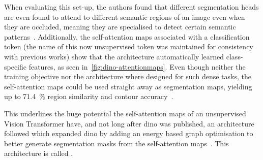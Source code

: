 When evaluating this set-up, the authors found that different segmentation heads are even found to attend to different semantic regions of an image even when they are occluded, meaning they are specialised to detect certain semantic patterns~\autocite{Caron2021}.
Additionally, the self-attention maps associated with a classification token (the name of this now unsupervised token was maintained for consistency with previous works) show that the architecture automatically learned class-specific features, as seen in~\autoref{fig:dino-attentionmaps}.
Even though neither the training objective nor the architecture where designed for such dense tasks, the self-attention maps could be used straight away as segmentation maps, yielding up to 71.4~\% region similarity and contour accuracy~\autocite{Caron2021}.

This underlines the huge potential the self-attention maps of an unsupervised Vision Transformer have, and not long after \gls{dino} was published, an architecture followed which expanded \gls{dino} by adding an energy based graph optimisation to better generate segmentation masks from the self-attention maps~\autocite{Hamilton2022}.
This architecture is called .





